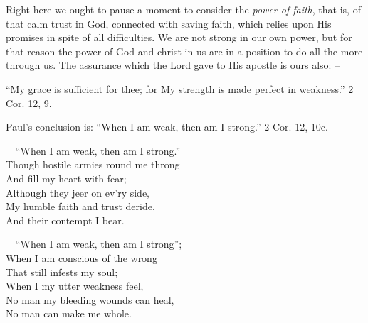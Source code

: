 \documentclass[
]{book}
\begin{document}
Right here we ought to pause a moment to consider the \emph{power of faith}, that is, of that calm trust in God, connected with saving faith, which relies upon His promises in spite of all difficulties. We are not strong in our own power, but for that reason the power of God and christ in us are in a position to do all the more through us. The assurance which the Lord gave to His apostle is ours also: --

``My grace is sufficient for thee; for My strength is made perfect in weakness.'' 2 Cor. 12, 9.

Paul's conclusion is: ``When I am weak, then am I strong.'' 2 Cor. 12, 10c.

~~``When I am weak, then am I strong.''\\
\hspace*{0.333em}\hspace*{0.333em}Though hostile armies round me throng\\
\hspace*{0.333em}\hspace*{0.333em}And fill my heart with fear;\\
\hspace*{0.333em}\hspace*{0.333em}Although they jeer on ev'ry side,\\
\hspace*{0.333em}\hspace*{0.333em}My humble faith and trust deride,\\
\hspace*{0.333em}\hspace*{0.333em}And their contempt I bear.

~~``When I am weak, then am I strong'';\\
\hspace*{0.333em}\hspace*{0.333em}When I am conscious of the wrong\\
\hspace*{0.333em}\hspace*{0.333em}That still infests my soul;\\
\hspace*{0.333em}\hspace*{0.333em}When I my utter weakness feel,\\
\hspace*{0.333em}\hspace*{0.333em}No man my bleeding wounds can heal,\\
\hspace*{0.333em}\hspace*{0.333em}No man can make me whole.
\end{document}
